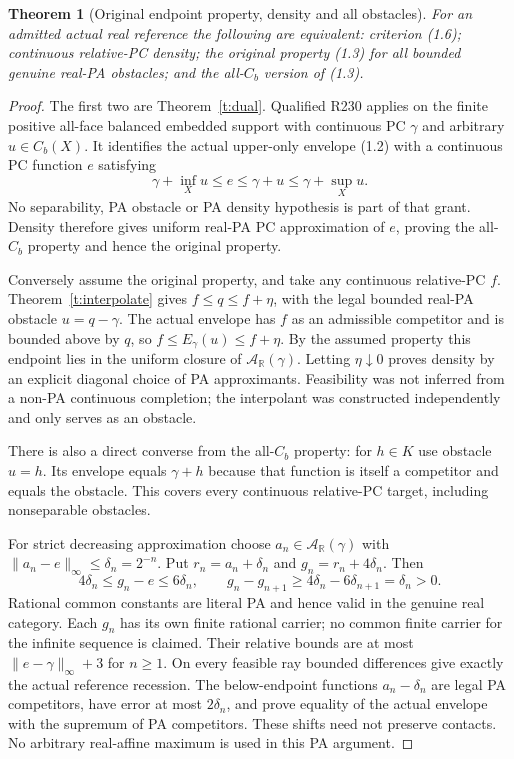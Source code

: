 \documentclass[11pt]{article}
\newtheorem{theorem}{Theorem}[section]
\newcommand{\R}{\mathbb R}\newcommand{\Q}{\mathbb Q}\newcommand{\Z}{\mathbb Z}
\begin{document}
\begin{theorem}[Original endpoint property, density and all obstacles]\label{t:bridge}
For an admitted actual real reference the following are equivalent: criterion (1.6); continuous relative-PC density; the original property (1.3) for all bounded genuine real-PA obstacles; and the all-$C_b$ version of (1.3).
\end{theorem}
\begin{proof}
The first two are Theorem~\ref{t:dual}. Qualified R230 applies on the finite positive all-face balanced embedded support with continuous PC $\gamma$ and arbitrary $u\in C_b(X)$. It identifies the actual upper-only envelope (1.2) with a continuous PC function $e$ satisfying
\[
 \gamma+\inf_Xu\leq e\leq\gamma+u\leq\gamma+\sup_Xu.                 \tag{6.4}
\]
No separability, PA obstacle or PA density hypothesis is part of that grant. Density therefore gives uniform real-PA PC approximation of $e$, proving the all-$C_b$ property and hence the original property.

Conversely assume the original property, and take any continuous relative-PC $f$. Theorem~\ref{t:interpolate} gives $f\leq q\leq f+\eta$, with the legal bounded real-PA obstacle $u=q-\gamma$. The actual envelope has $f$ as an admissible competitor and is bounded above by $q$, so $f\leq E_\gamma(u)\leq f+\eta$. By the assumed property this endpoint lies in the uniform closure of $\mathcal A_\R(\gamma)$. Letting $\eta\downarrow0$ proves density by an explicit diagonal choice of PA approximants. Feasibility was not inferred from a non-PA continuous completion; the interpolant was constructed independently and only serves as an obstacle.

There is also a direct converse from the all-$C_b$ property: for $h\in K$ use obstacle $u=h$. Its envelope equals $\gamma+h$ because that function is itself a competitor and equals the obstacle. This covers every continuous relative-PC target, including nonseparable obstacles.

For strict decreasing approximation choose $a_n\in\mathcal A_\R(\gamma)$ with $\|a_n-e\|_\infty\leq\delta_n=2^{-n}$. Put $r_n=a_n+\delta_n$ and $g_n=r_n+4\delta_n$. Then
\[
 4\delta_n\leq g_n-e\leq6\delta_n,\qquad
 g_n-g_{n+1}\geq4\delta_n-6\delta_{n+1}=\delta_n>0.
                                                                    \tag{6.5}
\]
Rational common constants are literal PA and hence valid in the genuine real category. Each $g_n$ has its own finite rational carrier; no common finite carrier for the infinite sequence is claimed. Their relative bounds are at most $\|e-\gamma\|_\infty+3$ for $n\geq1$. On every feasible ray bounded differences give exactly the actual reference recession. The below-endpoint functions $a_n-\delta_n$ are legal PA competitors, have error at most $2\delta_n$, and prove equality of the actual envelope with the supremum of PA competitors. These shifts need not preserve contacts. No arbitrary real-affine maximum is used in this PA argument.
\end{proof}
\end{document}
